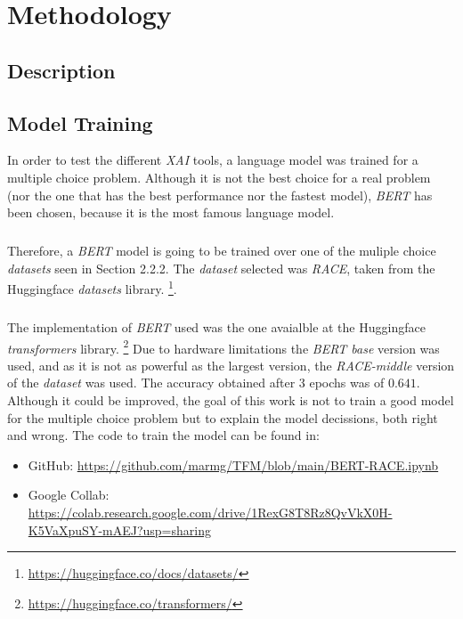 
\chapter{Methodology}
\label{ch:Methodology}
\noindent 

\section{Description}
\label{sec:Description}
\noindent

\section{Model Training}
\label{sec:Model training}
\noindent In order to test the different \emph{XAI} tools, a language model was trained for a multiple choice problem. Although it is not the best choice for a real problem (nor the one that has the best performance nor the fastest model), \emph{BERT} has been chosen, because it is the most famous language model. 
\paragraph{}
Therefore, a \emph{BERT} model is going to be trained over one of the muliple choice \emph{datasets} seen in Section 2.2.2. The \emph{dataset} selected was \emph{RACE}, taken from the Huggingface \emph{datasets} library. \footnote{\url{https://huggingface.co/docs/datasets/}}. 
\paragraph{}
The implementation of \emph{BERT} used was the one avaialble at the Huggingface \emph{transformers} library. \footnote{\url{https://huggingface.co/transformers/}} Due to hardware limitations the \emph{BERT base} version was used, and as it is not as powerful as the largest version, the \emph{RACE-middle} version of the \emph{dataset} was used. The accuracy obtained after 3 epochs was of $0.641$. Although it could be improved, the goal of this work is not to train a good model for the multiple choice problem but to explain the model decissions, both right and wrong. The code to train the model can be found in:
\begin{itemize}
	\item GitHub: \url{https://github.com/marmg/TFM/blob/main/BERT-RACE.ipynb}
	\item Google Collab: \url{https://colab.research.google.com/drive/1RexG8T8Rz8QvVkX0H-K5VaXpuSY-mAEJ?usp=sharing}
\end{itemize}
